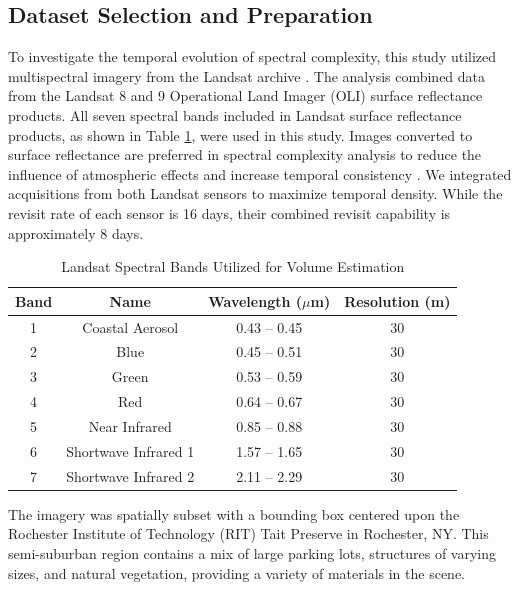 \documentclass[conference,a4paper]{IEEEtran}
\begin{document}
\subsection{Dataset Selection and Preparation}
To investigate the temporal evolution of spectral complexity, this study utilized multispectral imagery from the Landsat archive \cite{earth_resources_observation_and_science_eros_center_landsat_2022}. The analysis combined data from the Landsat 8 and 9 Operational Land Imager (OLI) surface reflectance products. All seven spectral bands included in Landsat surface reflectance products, as shown in Table \ref{tab:LandsatBands}, were used in this study. Images converted to surface reflectance are preferred in spectral complexity analysis to reduce the influence of atmospheric effects and increase temporal consistency \cite{wulder_current_2019}.  We integrated acquisitions from both Landsat sensors to maximize temporal density. While the revisit rate of each sensor is 16 days, their combined revisit capability is approximately 8 days.
\begin{table}[ht]
    \centering
    \caption{Landsat Spectral Bands Utilized for Volume Estimation}
    \label{tab:LandsatBands}
    \begin{tabular}{cccc}
    \hline
    \textbf{Band} & \textbf{Name} & \textbf{Wavelength} ($\mu$m) & \textbf{Resolution} (m) \\
    \hline
    1 & Coastal Aerosol      & 0.43 -- 0.45 & 30 \\
    2 & Blue                 & 0.45 -- 0.51 & 30 \\
    3 & Green                & 0.53 -- 0.59 & 30 \\
    4 & Red                  & 0.64 -- 0.67 & 30 \\
    5 & Near Infrared        & 0.85 -- 0.88 & 30 \\
    6 & Shortwave Infrared 1 & 1.57 -- 1.65 & 30 \\
    7 & Shortwave Infrared 2 & 2.11 -- 2.29 & 30 \\
    \hline
    \end{tabular}
\end{table}

The imagery was spatially subset with a bounding box centered upon the Rochester Institute of Technology (RIT) Tait Preserve in Rochester, NY. %
This semi-suburban region contains a mix of large parking lots, structures of varying sizes, and natural vegetation, providing a variety of materials in the scene.
\end{document}
